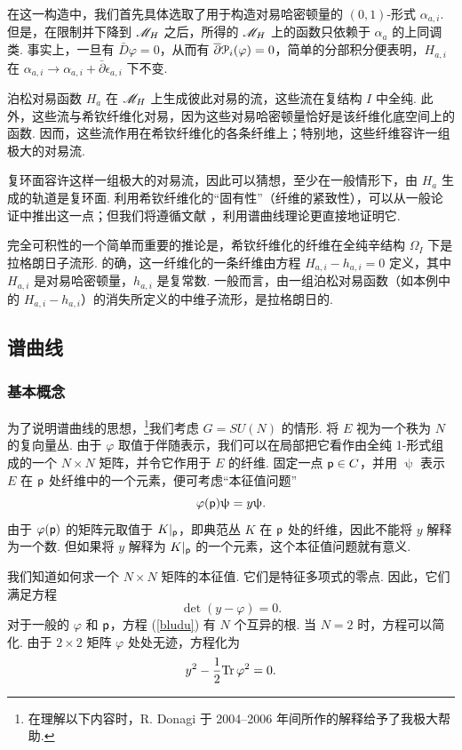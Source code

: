 在这一构造中，我们首先具体选取了用于构造对易哈密顿量的 $(0,1)$-形式 $\alpha_{a,i}$. 但是，在限制并下降到 $\MH$ 之后，所得的 $\MH$ 上的函数只依赖于 $\alpha_a$ 的上同调类. 事实上，一旦有 $\bar D\varphi=0$，从而有 $\bar\partial {\cal P}_i(\varphi)=0$，简单的分部积分便表明，$H_{a,i}$ 在 $\alpha_{a,i}\to\alpha_{a,i}+\bar\partial\epsilon_{a,i}$ 下不变.

泊松对易函数 $H_a$ 在 $\MH$ 上生成彼此对易的流，这些流在复结构 $I$ 中全纯. 此外，这些流与希钦纤维化对易，因为这些对易哈密顿量恰好是该纤维化底空间上的函数. 因而，这些流作用在希钦纤维化的各条纤维上；特别地，这些纤维容许一组极大的对易流.

复环面容许这样一组极大的对易流，因此可以猜想，至少在一般情形下，由 $H_a$ 生成的轨道是复环面. 利用希钦纤维化的“固有性”（纤维的紧致性），可以从一般论证中推出这一点；但我们将遵循文献 \cite{HitchinDuke}，利用谱曲线理论更直接地证明它.

完全可积性的一个简单而重要的推论是，希钦纤维化的纤维在全纯辛结构 $\Omega_I$ 下是拉格朗日子流形. 的确，这一纤维化的一条纤维由方程 $H_{a,i}-h_{a,i}=0$ 定义，其中 $H_{a,i}$ 是对易哈密顿量，$h_{a,i}$ 是复常数. 一般而言，由一组泊松对易函数（如本例中的 $H_{a,i}-h_{a,i}$）的消失所定义的中维子流形，是拉格朗日的.

\subsection{谱曲线}
\label{spectral}

\subsubsection{基本概念}

为了说明谱曲线的思想，\footnote{在理解以下内容时，R. Donagi 于 2004--2006 年间所作的解释给予了我极大帮助.}我们考虑 $G=SU(N)$ 的情形. 将 $E$ 视为一个秩为 $N$ 的复向量丛. 由于 $\varphi$ 取值于伴随表示，我们可以在局部把它看作由全纯 1-形式组成的一个 $N\times N$ 矩阵，并令它作用于 $E$ 的纤维. 固定一点 $\pp\in C$，并用 $\uppsi$ 表示 $E$ 在 $\pp$ 处纤维中的一个元素，便可考虑“本征值问题”
\begin{equation}
\label{udu}
\varphi(\pp)\uppsi=y\uppsi.
\end{equation}
由于 $\varphi(\pp)$ 的矩阵元取值于 $K|_\pp$，即典范丛 $K$ 在 $\pp$ 处的纤维，因此不能将 $y$ 解释为一个数. 但如果将 $y$ 解释为 $K|_\pp$ 的一个元素，这个本征值问题就有意义.

我们知道如何求一个 $N\times N$ 矩阵的本征值. 它们是特征多项式的零点. 因此，它们满足方程
\begin{equation}
\label{bludu}
\det(y-\varphi)=0.
\end{equation}
对于一般的 $\varphi$ 和 $\pp$，方程 (\ref{bludu}) 有 $N$ 个互异的根. 当 $N=2$ 时，方程可以简化. 由于 $2\times 2$ 矩阵 $\varphi$ 处处无迹，方程化为
\begin{equation}
\label{tudlu}
y^2-{1\over 2}\Tr\,\varphi^2=0.
\end{equation}

